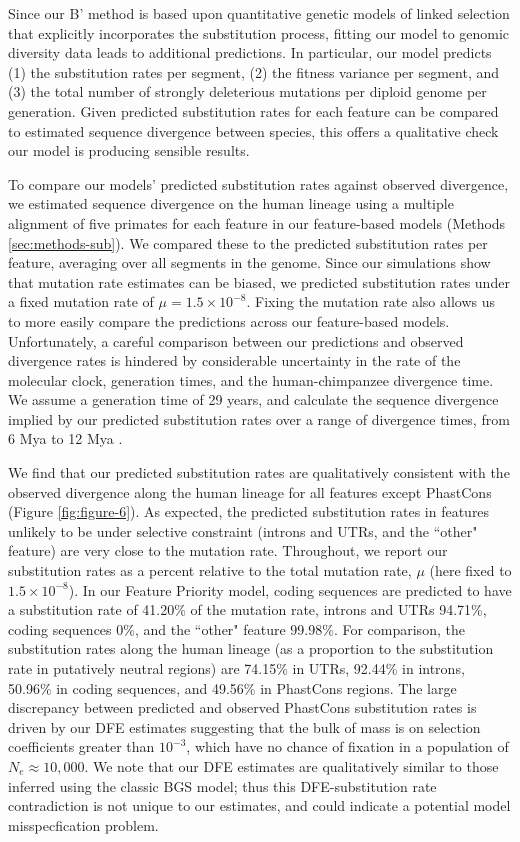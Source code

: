 \documentclass[11pt]{article}
\begin{document}
Since our B' method is based upon quantitative genetic models of linked
selection that explicitly incorporates the substitution process, fitting our
model to genomic diversity data leads to additional predictions. In particular,
our model predicts (1) the substitution rates per segment, (2) the fitness
variance per segment, and (3) the total number of strongly deleterious
mutations per diploid genome per generation. Given predicted substitution rates
for each feature can be compared to estimated sequence divergence between
species, this offers a qualitative check our model is producing sensible
results. 

To compare our models' predicted substitution rates against observed
divergence, we estimated sequence divergence on the human lineage using a
multiple alignment of five primates for each feature in our feature-based
models (Methods \ref{sec:methods-sub}). We compared these to the predicted
substitution rates per feature, averaging over all segments in the genome.
Since our simulations show that mutation rate estimates can be biased, we
predicted substitution rates under a fixed mutation rate of $\mu = 1.5 \times
10^{-8}$. Fixing the mutation rate also allows us to more easily compare the
predictions across our feature-based models. Unfortunately, a careful
comparison between our predictions and observed divergence rates is hindered by
considerable uncertainty in the rate of the molecular clock, generation times,
and the human-chimpanzee divergence time. We assume a generation time of 29
years, and calculate the sequence divergence implied by our predicted
substitution rates over a range of divergence times, from 6 Mya to 12 Mya
\parencite{Moorjani2016-tb,Nachman2000-te,Yi2002-pw,Steiper2006-xx}.

We find that our predicted substitution rates are qualitatively consistent with
the observed divergence along the human lineage for all features except
PhastCons (Figure \ref{fig:figure-6}). As expected, the predicted substitution
rates in features unlikely to be under selective constraint (introns and UTRs,
and the ``other" feature) are very close to the mutation rate. Throughout, we
report our substitution rates as a percent relative to the total mutation rate,
$\mu$ (here fixed to $1.5 \times 10^{-8}$). In our Feature Priority model,
coding sequences are predicted to have a substitution rate of 41.20\% of the
mutation rate, introns and UTRs 94.71\%, coding sequences 0\%, and the ``other"
feature 99.98\%. For comparison, the substitution rates along the human lineage
(as a proportion to the substitution rate in putatively neutral regions) are
74.15\% in UTRs, 92.44\% in introns, 50.96\% in coding sequences, and 49.56\%
in PhastCons regions. The large discrepancy between predicted and observed
PhastCons substitution rates is driven by our DFE estimates suggesting that the
bulk of mass is on selection coefficients greater than $10^{-3}$, which have no
chance of fixation in a population of $N_e \approx 10,000$. We note that our
DFE estimates are qualitatively similar to those inferred using the classic BGS
model; thus this DFE-substitution rate contradiction is not unique to our
estimates, and could indicate a potential model misspecfication problem.
\end{document}
